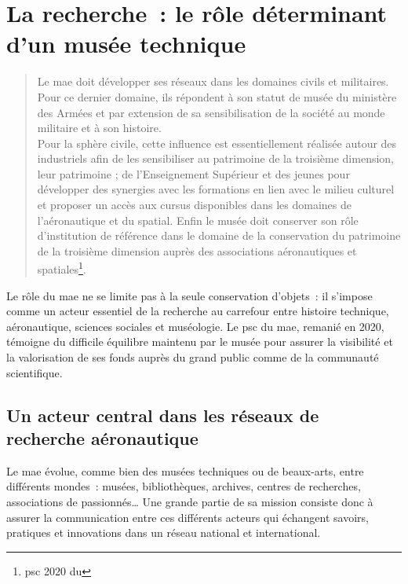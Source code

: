 \section{\label{I-A-2}La recherche~: le rôle déterminant d'un musée technique}

\begin{quote}
	\og Le \acf{mae} doit développer ses réseaux \textelp{} dans les domaines civils et militaires. Pour ce dernier domaine, ils répondent à son statut de musée du ministère des Armées et par extension de sa sensibilisation de la société au monde militaire et à son histoire.\\
	Pour la sphère civile, cette influence est essentiellement réalisée autour des industriels afin de les sensibiliser au patrimoine de la troisième dimension, leur patrimoine ; de l’Enseignement Supérieur et des jeunes pour développer des synergies avec les formations en lien avec le milieu culturel et proposer un accès aux cursus disponibles dans les domaines de l’aéronautique et du spatial. Enfin \textelp{} le musée doit conserver son rôle d’institution de référence dans le domaine de la conservation du patrimoine de la troisième dimension auprès des associations aéronautiques et spatiales\footnote{\Ac{psc} 2020 du \mae}.\fg
\end{quote}


Le rôle du \ac{mae} ne se limite pas à la seule conservation d'objets~: il s'impose comme un acteur essentiel de la recherche au carrefour entre histoire technique, aéronautique, sciences sociales et muséologie. Le \ac{psc} du \acf{mae}, remanié en 2020, témoigne du difficile équilibre maintenu par le musée pour assurer la visibilité et la valorisation de ses fonds auprès du grand public comme de la communauté scientifique.

\subsection{Un acteur central dans les réseaux de recherche aéronautique}

Le \ac{mae} évolue, comme bien des musées techniques ou de beaux-arts, entre différents mondes~: musées, bibliothèques, archives, centres de recherches, associations de passionnés\ldots{} Une grande partie de sa mission consiste donc à assurer la communication entre ces différents acteurs qui échangent savoirs, pratiques et innovations dans un réseau national et international.

